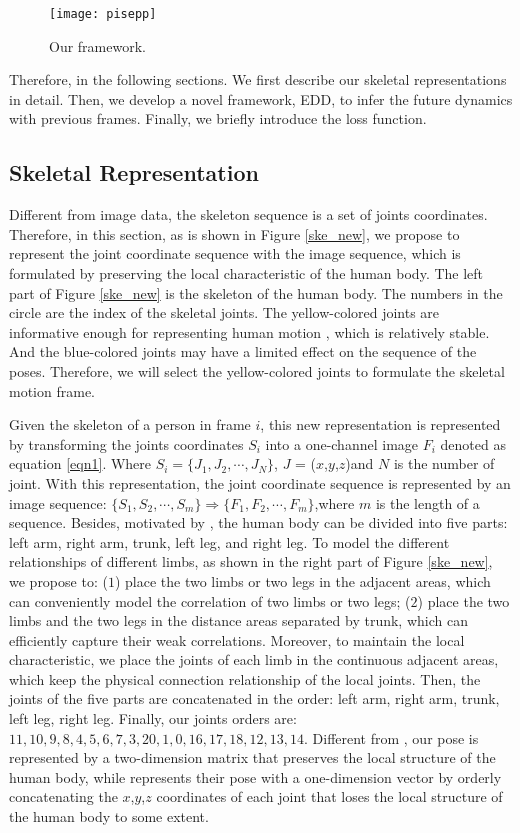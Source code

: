 \documentclass[journal]{IEEEtran}
\begin{document}
\begin{figure}[!t]
\centering
\texttt{[image: pisepp]}
\caption{Our framework.}
\label{pisepp}
\end{figure}



Therefore, in the following sections. We first describe our skeletal representations in detail. Then, we develop a novel framework, EDD, to infer the future dynamics with previous frames. Finally, we briefly introduce the loss function.

\subsection{Skeletal Representation}
Different from image data, the skeleton sequence is a set of joints coordinates. Therefore, in this section, as is shown in Figure \ref{ske_new}, we propose to represent the joint coordinate sequence with the image sequence, which is formulated by preserving the local characteristic of the human body. The left part of Figure \ref{ske_new} is the skeleton of the human body. The numbers in the circle are the index of the skeletal joints. The yellow-colored joints are informative enough for representing human motion \cite{BIPOD}, which is relatively stable. And the blue-colored joints may have a limited effect on the sequence of the poses. Therefore, we will select the yellow-colored joints to formulate the skeletal motion frame.

Given the skeleton of a person in frame ${i}$, this new representation is represented by transforming the joints coordinates ${S_i}$ into a one-channel image ${F_i}$ denoted as equation \ref{eqn1}. Where ${S_i} = \{{J_1},{J_2}, \cdots ,{J_N}\}$, ${J}$ = (${x} $,${y}$,${z}$)and ${N}$ is the number of joint. With this representation, the joint coordinate sequence is represented by an image sequence: $\{ {S_1},{S_2}, \cdots ,{S_m}\}  \Rightarrow \{ {F_1},{F_2}, \cdots ,{F_m}\}$,where ${m}$ is the length of a sequence. Besides, motivated by \cite{srnnar2015,biodsf2013}, the human body can be divided into five parts: left arm, right arm, trunk, left leg, and right leg. To model the different relationships of different limbs, as shown in the right part of Figure \ref{ske_new}, we propose to: (${1}$) place the two limbs or two legs in the adjacent areas, which can conveniently model the correlation of two limbs or two legs; (${2}$) place the two limbs and the two legs in the distance areas separated by trunk, which can efficiently capture their weak correlations. Moreover, to maintain the local characteristic, we place the joints of each limb in the continuous adjacent areas, which keep the physical connection relationship of the local joints. Then, the joints of the five parts are concatenated in the order: left arm, right arm, trunk, left leg, right leg. Finally, our joints orders are: ${11,10,9,8,4,5,6,7,3,20, 1,0,16,17,18,12,13,14}$. Different from \cite{srnnar2015}, our pose is represented by a two-dimension matrix that preserves the local structure of the human body, while \cite{srnnar2015} represents their pose with a one-dimension vector by orderly concatenating the ${x}$,${y}$,${z}$ coordinates of each joint that loses the local structure of the human body to some extent.
\end{document}
